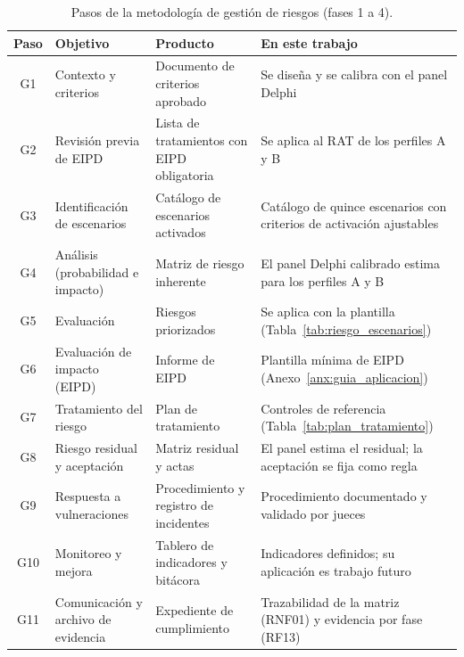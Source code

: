 \begin{table}[htbp]
  \centering
  \caption{Pasos de la metodología de gestión de riesgos (fases 1 a 4).}
  \label{tab:pasos_gestion}
  \scriptsize
  \renewcommand{\arraystretch}{1.12}
  \begin{tabularx}{\textwidth}{|c|>{\raggedright\arraybackslash}p{3.0cm}|>{\raggedright\arraybackslash}p{3.4cm}|L|}
    \hline
    \textbf{Paso} & \textbf{Objetivo} & \textbf{Producto} & \textbf{En este trabajo} \\
    \hline
    G1 & Contexto y criterios & Documento de criterios aprobado & Se diseña y se calibra con el panel Delphi \\ \hline
    G2 & Revisión previa de EIPD & Lista de tratamientos con EIPD obligatoria & Se aplica al RAT de los perfiles A y B \\ \hline
    G3 & Identificación de escenarios & Catálogo de escenarios activados & Catálogo de quince escenarios con criterios de activación ajustables \\ \hline
    G4 & Análisis (probabilidad e impacto) & Matriz de riesgo inherente & El panel Delphi calibrado estima para los perfiles A y B \\ \hline
    G5 & Evaluación & Riesgos priorizados & Se aplica con la plantilla (Tabla~\ref{tab:riesgo_escenarios}) \\ \hline
    G6 & Evaluación de impacto (EIPD) & Informe de EIPD & Plantilla mínima de EIPD (Anexo~\ref{anx:guia_aplicacion}) \\ \hline
    G7 & Tratamiento del riesgo & Plan de tratamiento & Controles de referencia (Tabla~\ref{tab:plan_tratamiento}) \\ \hline
    G8 & Riesgo residual y aceptación & Matriz residual y actas & El panel estima el residual; la aceptación se fija como regla \\ \hline
    G9 & Respuesta a vulneraciones & Procedimiento y registro de incidentes & Procedimiento documentado y validado por jueces \\ \hline
    G10 & Monitoreo y mejora & Tablero de indicadores y bitácora & Indicadores definidos; su aplicación es trabajo futuro \\ \hline
    G11 & Comunicación y archivo de evidencia & Expediente de cumplimiento & Trazabilidad de la matriz (RNF01) y evidencia por fase (RF13) \\ \hline
  \end{tabularx}
  \raggedright
\end{table}

